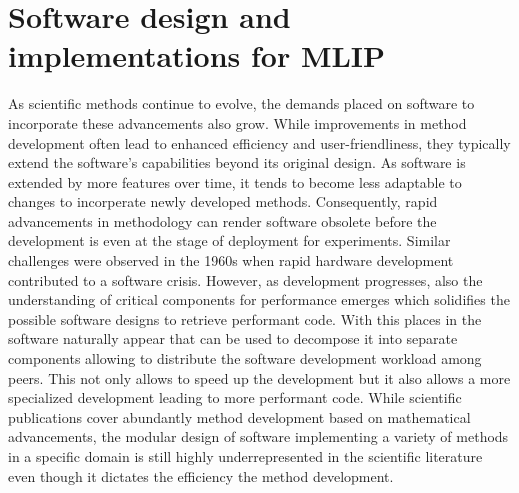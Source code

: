 \chapter{Software design and implementations for MLIP}


As scientific methods continue to evolve, the demands placed on software to incorporate these advancements also grow.
While improvements in method development often lead to enhanced efficiency and user-friendliness, they typically extend the software's capabilities beyond its original design.
As software is extended by more features over time, it tends to become less adaptable to changes to incorperate newly developed methods.
Consequently, rapid advancements in methodology can render software obsolete before the development is even at the stage of deployment for experiments.
Similar challenges were observed in the 1960s when rapid hardware development contributed to a software crisis\cite{brian2012software_crisis}.
However, as development progresses, also the understanding of critical components for performance emerges which solidifies the possible software designs to retrieve performant code.
With this places in the software naturally appear that can be used to decompose it into separate components allowing to distribute the software development workload among peers.
This not only allows to speed up the development but it also allows a more specialized development leading to more performant code.
While scientific publications cover abundantly method development based on mathematical advancements, the modular design of software implementing a variety of methods in a specific domain is still highly underrepresented in the scientific literature even though it dictates the efficiency the method development.
